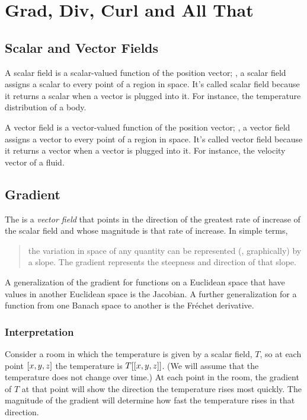 \section{Grad, Div, Curl and All That}

\subsection{Scalar and Vector Fields}
A scalar field is a scalar-valued function of the position vector; \ie, a scalar field assigns a scalar to every point of a region in space. It's called scalar field because it returns a scalar when a vector is plugged into it. For instance, the temperature distribution of a body.

A vector field is a vector-valued function of the position vector; \ie, a vector field assigns a vector to every point of a region in space. It's called vector field because it returns a vector when a vector is plugged into it. For instance, the velocity vector of a fluid.


\subsection{Gradient}
The  is a \emph{vector field} that points in the direction of the greatest rate of increase of the scalar field and whose magnitude is that rate of increase. In simple terms, 
\begin{quote}
the variation in space of any quantity can be represented (\eg, graphically) by a slope. The gradient represents the steepness and direction of that slope.
\end{quote}

A generalization of the gradient for functions on a Euclidean space that have values in another Euclidean space is the Jacobian. A further generalization for a function from one Banach space to another is the Fréchet derivative.


\subsubsection{Interpretation}
Consider a room in which the temperature is given by a scalar field, $T$, so at each point $\left[{x,y,z}\right]$ the temperature is $T\!\left[{\left[{x,y,z}\right]}\right]$. (We will assume that the temperature does not change over time.) At each point in the room, the gradient of $T$ at that point will show the direction the temperature rises most quickly. The magnitude of the gradient will determine how fast the temperature rises in that direction.


